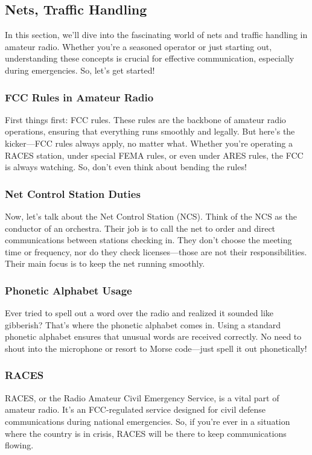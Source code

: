 \subsection{Nets, Traffic Handling}
\label{subsec:nets-traffic}

In this section, we'll dive into the fascinating world of nets and traffic handling in amateur radio. Whether you're a seasoned operator or just starting out, understanding these concepts is crucial for effective communication, especially during emergencies. So, let's get started!

\subsubsection*{FCC Rules in Amateur Radio}
First things first: FCC rules. These rules are the backbone of amateur radio operations, ensuring that everything runs smoothly and legally. But here's the kicker—FCC rules always apply, no matter what. Whether you're operating a RACES station, under special FEMA rules, or even under ARES rules, the FCC is always watching. So, don't even think about bending the rules!

\subsubsection*{Net Control Station Duties}
Now, let's talk about the Net Control Station (NCS). Think of the NCS as the conductor of an orchestra. Their job is to call the net to order and direct communications between stations checking in. They don't choose the meeting time or frequency, nor do they check licenses—those are not their responsibilities. Their main focus is to keep the net running smoothly.

\subsubsection*{Phonetic Alphabet Usage}
Ever tried to spell out a word over the radio and realized it sounded like gibberish? That's where the phonetic alphabet comes in. Using a standard phonetic alphabet ensures that unusual words are received correctly. No need to shout into the microphone or resort to Morse code—just spell it out phonetically!

\subsubsection*{RACES}
RACES, or the Radio Amateur Civil Emergency Service, is a vital part of amateur radio. It's an FCC-regulated service designed for civil defense communications during national emergencies. So, if you're ever in a situation where the country is in crisis, RACES will be there to keep communications flowing.

